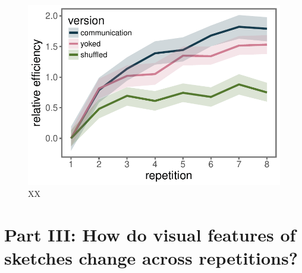 \documentclass[10pt,letterpaper]{article}
\begin{document}
\begin{figure}
\includegraphics[width=\linewidth]{figures/recog_BIS_timeseries.pdf}
\caption{XX} \label{recog_bis}
\end{figure}

\section{Part III: How do visual features of sketches change across repetitions?}
\end{document}
